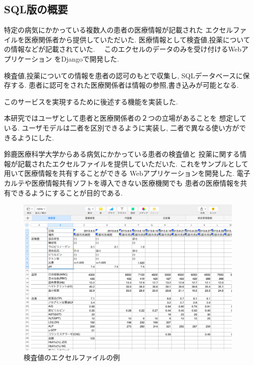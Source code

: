 \subsection{SQL版の概要}

  特定の病気にかかっている複数人の患者の医療情報が記載された
  エクセルファイルを医療関係者から提供していただいた.
  医療情報として検査値,投薬についての情報などが記載されていた.
　このエクセルのデータのみを受け付けるWebアプリケーション
  をDjangoで開発した.

  検査値,投薬についての情報を患者の認可のもとで収集し,
  SQLデータベースに保存する.
  患者に認可をされた医療関係者は情報の参照,書き込みが可能となる.

  このサービスを実現するために後述する機能を実装した.

  本研究ではユーザとして患者と医療関係者の２つの立場があることを
  想定している.
  ユーザモデルは二者を区別できるように実装し,
  二者で異なる使い方ができるようにした.
  \fi


  鈴鹿医療科学大学からある病気にかかっている患者の検査値と
  投薬に関する情報が記載されたエクセルファイルを提供していただいた.
  これをサンプルとして用いて医療情報を共有することができる
  Webアプリケーションを開発した.
  電子カルテや医療情報共有ソフトを導入できない医療機関でも
  患者の医療情報を共有できるようにすることが目的である.

  \begin{figure}[htbp]
    \begin{center}
      \includegraphics[width=13cm, bb=0 0 1049 733]{./gazou/excel-data.png}
    \end{center}
    \caption{検査値のエクセルファイルの例}
    \label{excel-data}
  \end{figure}

